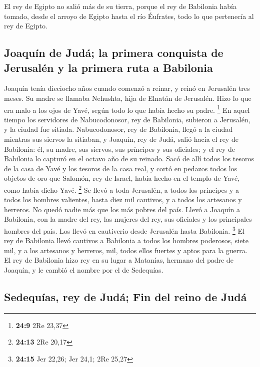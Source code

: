  El rey de Egipto no salió más de su tierra, porque el rey
de Babilonia había tomado, desde el arroyo de Egipto hasta el río
Éufrates, todo lo que pertenecía al rey de Egipto.

\hypertarget{joaquuxedn-de-juduxe1-la-primera-conquista-de-jerusaluxe9n-y-la-primera-ruta-a-babilonia}{%
\subsection{Joaquín de Judá; la primera conquista de Jerusalén y la
primera ruta a
Babilonia}\label{joaquuxedn-de-juduxe1-la-primera-conquista-de-jerusaluxe9n-y-la-primera-ruta-a-babilonia}}

 Joaquín tenía dieciocho años cuando comenzó a reinar, y
reinó en Jerusalén tres meses. Su madre se llamaba Nehushta, hija de
Elnatán de Jerusalén.  Hizo lo que era malo a los ojos de
Yavé, según todo lo que había hecho su padre. \footnote{\textbf{24:9}
  2Re 23,37}  En aquel tiempo los servidores de
Nabucodonosor, rey de Babilonia, subieron a Jerusalén, y la ciudad fue
sitiada.  Nabucodonosor, rey de Babilonia, llegó a la
ciudad mientras sus siervos la sitiaban,  y Joaquín, rey
de Judá, salió hacia el rey de Babilonia: él, su madre, sus siervos, sus
príncipes y sus oficiales; y el rey de Babilonia lo capturó en el octavo
año de su reinado.  Sacó de allí todos los tesoros de la
casa de Yavé y los tesoros de la casa real, y cortó en pedazos todos los
objetos de oro que Salomón, rey de Israel, había hecho en el templo de
Yavé, como había dicho Yavé. \footnote{\textbf{24:13} 2Re 20,17}
 Se llevó a toda Jerusalén, a todos los príncipes y a
todos los hombres valientes, hasta diez mil cautivos, y a todos los
artesanos y herreros. No quedó nadie más que los más pobres del país.
 Llevó a Joaquín a Babilonia, con la madre del rey, las
mujeres del rey, sus oficiales y los principales hombres del país. Los
llevó en cautiverio desde Jerusalén hasta Babilonia. \footnote{\textbf{24:15}
  Jer 22,26; Jer 24,1; 2Re 25,27}  El rey de Babilonia
llevó cautivos a Babilonia a todos los hombres poderosos, siete mil, y a
los artesanos y herreros, mil, todos ellos fuertes y aptos para la
guerra.  El rey de Babilonia hizo rey en su lugar a
Matanías, hermano del padre de Joaquín, y le cambió el nombre por el de
Sedequías.

\hypertarget{sedequuxedas-rey-de-juduxe1-fin-del-reino-de-juduxe1}{%
\subsection{Sedequías, rey de Judá; Fin del reino de
Judá}\label{sedequuxedas-rey-de-juduxe1-fin-del-reino-de-juduxe1}}

